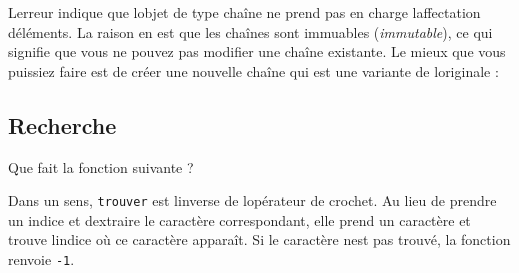 L\textquotesingle erreur indique que l\textquotesingle objet de type
chaîne ne prend pas en charge l\textquotesingle affectation
d\textquotesingle éléments. La raison en est que les chaînes sont
immuables (\emph{immutable}), ce qui signifie que vous ne pouvez pas
modifier une chaîne existante. Le mieux que vous puissiez faire est de
créer une nouvelle chaîne qui est une variante de
l\textquotesingle originale :

\begin{Shaded}
\begin{Highlighting}[]
\OperatorTok{\textgreater{}\textgreater{}\textgreater{}}\OperatorTok{=} 
\OperatorTok{\textgreater{}\textgreater{}\textgreater{}}\OperatorTok{=}  \OperatorTok{+}\NormalTok{ salut[}\NormalTok{:]}
\OperatorTok{\textgreater{}\textgreater{}\textgreater{}}
\end{Highlighting}
\end{Shaded}

\hypertarget{recherche}{%
\subsection{Recherche}\label{recherche}}

Que fait la fonction suivante ?

\begin{Shaded}
\begin{Highlighting}[]
\OperatorTok{=} 
    \OperatorTok{\textless{}} 
        \OperatorTok{==}
\OperatorTok{=}\OperatorTok{+} 
     \OperatorTok{{-}}
\end{Highlighting}
\end{Shaded}

Dans un sens, \texttt{trouver} est l\textquotesingle inverse de
l\textquotesingle opérateur de crochet. Au lieu de prendre un indice et
d\textquotesingle extraire le caractère correspondant, elle prend un
caractère et trouve l\textquotesingle indice où ce caractère apparaît.
Si le caractère n\textquotesingle est pas trouvé, la fonction renvoie
\texttt{-1}.

